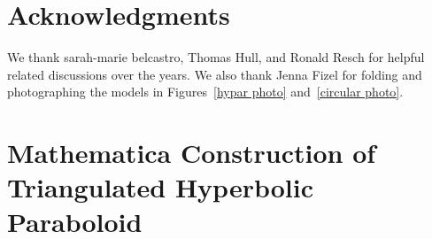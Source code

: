 \documentclass[11pt,letterpaper]{article}
\begin{document}
\section*{Acknowledgments}

We thank sarah-marie belcastro, Thomas Hull, and Ronald Resch for
helpful related discussions over the years.
We also thank Jenna Fizel for folding and photographing the models
in Figures~\ref{hypar photo} and~\ref{circular photo}.








\appendix
\section{Mathematica Construction of Triangulated Hyperbolic Paraboloid}
\label{mathematica}

\begin{small}

\end{small}
\end{document}
